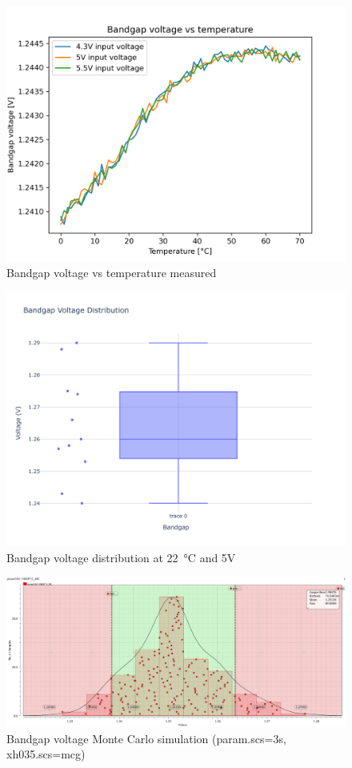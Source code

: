 \begin{figure}[ht]
	\centering
	\includegraphics[width=\textwidth]{images/05_bandgap/Bandgap.png}
	\caption{Bandgap voltage vs temperature measured}
	\label{fig:bandgap_voltage_vs_temp_mes}
\end{figure}
\begin{figure}[ht]
	\centering
	\includegraphics[width=\textwidth]{images/Bandgap_Voltage_Distribution.png}
	\caption{Bandgap voltage distribution at \qty{22}{\degreeCelsius} and 5V}
	\label{fig:bandgap_voltage_distrb}
\end{figure}

\begin{figure}[ht]
	\centering
	\includegraphics[width=\textwidth]{images/05_bandgap/band_volt_mc.pdf}
	\caption{Bandgap voltage Monte Carlo simulation (param.scs=3s, xh035.scs=mcg)}
	\label{fig:bandgap_voltage_mc}
\end{figure}
\clearpage
